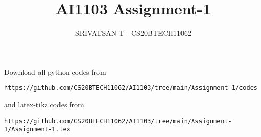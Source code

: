 \documentclass[journal,12pt,twocolumn]{IEEEtran}
\DeclareMathOperator*{\Res}{Res}
\begin{document}
\newcommand{\BEQA}{\begin{eqnarray}}
\newcommand{\EEQA}{\end{eqnarray}}
\newcommand{\define}{\stackrel{\triangle}{=}}

\raggedbottom
\setlength{\parindent}{0pt}
\providecommand{\mbf}{\mathbf}
\providecommand{\pr}[1]{\ensuremath{\Pr\left(#1\right)}}
\providecommand{\qfunc}[1]{\ensuremath{Q\left(#1\right)}}
\providecommand{\sbrak}[1]{\ensuremath{{}\left[#1\right]}}
\providecommand{\lsbrak}[1]{\ensuremath{{}\left[#1\right.}}
\providecommand{\rsbrak}[1]{\ensuremath{{}\left.#1\right]}}
\providecommand{\brak}[1]{\ensuremath{\left(#1\right)}}
\providecommand{\lbrak}[1]{\ensuremath{\left(#1\right.}}
\providecommand{\rbrak}[1]{\ensuremath{\left.#1\right)}}
\providecommand{\cbrak}[1]{\ensuremath{\left\{#1\right\}}}
\providecommand{\lcbrak}[1]{\ensuremath{\left\{#1\right.}}
\providecommand{\rcbrak}[1]{\ensuremath{\left.#1\right\}}}
\theoremstyle{remark}
\newtheorem{rem}{Remark}
\newcommand{\sgn}{\mathop{\mathrm{sgn}}}
\providecommand{\abs}[1]{\vert#1\vert}
\providecommand{\res}[1]{\Res\displaylimits_{#1}} 
\providecommand{\norm}[1]{\lVert#1\rVert}
\providecommand{\mtx}[1]{\mathbf{#1}}
\providecommand{\mean}[1]{E[#1]}
\providecommand{\fourier}{\overset{\mathcal{F}}{ \rightleftharpoons}}
\providecommand{\system}{\overset{\mathcal{H}}{ \longleftrightarrow}}
\newcommand{\solution}{\noindent \textbf{Solution: }}
\newcommand{\cosec}{\,\text{cosec}\,}
\providecommand{\dec}[2]{\ensuremath{\overset{#1}{\underset{#2}{\gtrless}}}}
\newcommand{\myvec}[1]{\ensuremath{\begin{pmatrix}#1\end{pmatrix}}}
\newcommand{\mydet}[1]{\ensuremath{\begin{vmatrix}#1\end{vmatrix}}}
\makeatletter
{}
\makeatother
\let\StandardTheFigure\thefigure
\let\vec\mathbf
\renewcommand{\thefigure}{\theproblem}
\def\putbox#1#2#3{\makebox[0in][l]{\makebox[#1][l]{}\raisebox{\baselineskip}[0in][0in]{\raisebox{#2}[0in][0in]{#3}}}}
     \def\rightbox#1{\makebox[0in][r]{#1}}
     \def\centbox#1{\makebox[0in]{#1}}
     \def\topbox#1{\raisebox{-\baselineskip}[0in][0in]{#1}}
     \def\midbox#1{\raisebox{-0.5\baselineskip}[0in][0in]{#1}}
\vspace{3cm}
\title{AI1103 Assignment-1}
\author{SRIVATSAN T - CS20BTECH11062}
\maketitle
\newpage
\bigskip
\renewcommand{\thefigure}{\theenumi}
\renewcommand{\thetable}{\theenumi}
Download all python codes from 
\begin{lstlisting}
https://github.com/CS20BTECH11062/AI1103/tree/main/Assignment-1/codes
\end{lstlisting}
%
and latex-tikz codes from 
%
\begin{lstlisting}
https://github.com/CS20BTECH11062/AI1103/tree/main/Assignment-1/Assignment-1.tex
\end{lstlisting}
\end{document}
